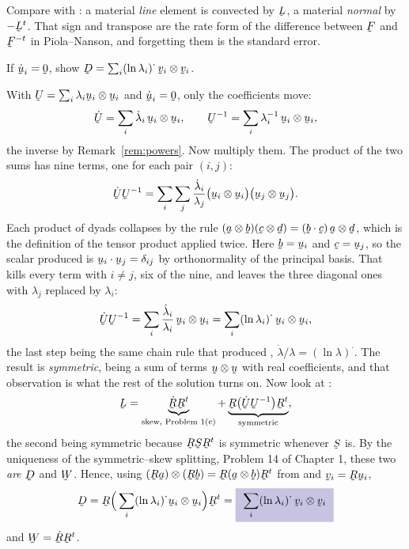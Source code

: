 \begin{solution}
Compare with : a material \emph{line} element is convected by
$\bL$, a material \emph{normal} by $-\bL^{t}$. That sign and transpose
are the rate form of the difference between $\bF$ and $\bF^{-t}$ in
Piola--Nanson, and forgetting them is the standard error.
\end{solution}

\begin{problem}
If $\dot\bu_{i}=\bze$, show
$\bD=\sum_{i}(\ln\lambda_{i})^{\textstyle\cdot}\,\bv_{i}\otimes\bv_{i}$.
\end{problem}

\begin{solution}
With $\bU=\sum_{i}\lambda_{i}\bu_{i}\otimes\bu_{i}$ and
$\dot\bu_{i}=\bze$, only the coefficients move:
\[
   \dot\bU=\sum_{i}\dot\lambda_{i}\,\bu_{i}\otimes\bu_{i},
   \qquad
   \bU^{-1}=\sum_{i}\lambda_{i}^{-1}\,\bu_{i}\otimes\bu_{i},
\]
the inverse by Remark~\ref{rem:powers}. Now multiply them. The product of
the two sums has nine terms, one for each pair $(i,j)$:
\[
   \dot\bU\bU^{-1}
   =\sum_{i}\sum_{j}\frac{\dot\lambda_{i}}{\lambda_{j}}
     \big(\bu_{i}\otimes\bu_{i}\big)\big(\bu_{j}\otimes\bu_{j}\big).
\]
Each product of dyads collapses by the rule
$(\ba\otimes\bb)(\bc\otimes\bd)=(\ip\bb\bc)\,\ba\otimes\bd$, which is the
definition of the tensor product applied twice. Here $\bb=\bu_{i}$ and
$\bc=\bu_{j}$, so the scalar produced is $\ip{\bu_{i}}{\bu_{j}}=\dd_{ij}$
by orthonormality of the principal basis. That kills every term with
$i\neq j$, six of the nine, and leaves the three diagonal ones with
$\lambda_{j}$ replaced by $\lambda_{i}$:
\[
   \dot\bU\bU^{-1}
   =\sum_{i}\frac{\dot\lambda_{i}}{\lambda_{i}}\,
     \bu_{i}\otimes\bu_{i}
   =\sum_{i}(\ln\lambda_{i})^{\textstyle\cdot}\,\bu_{i}\otimes\bu_{i},
\]
the last step being the same chain rule that produced ,
$\dot\lambda/\lambda=(\ln\lambda)^{\textstyle\cdot}$. The result is
\emph{symmetric}, being a sum of terms $\bu\otimes\bu$ with real
coefficients, and that observation is what the rest of the solution turns
on. Now look at :
\[
   \bL=\underbrace{\dot\bR\bR^{t}}_{\text{skew, Problem 1(c)}}
      +\underbrace{\bR\big(\dot\bU\bU^{-1}\big)\bR^{t}}_{\text{symmetric}},
\]
the second being symmetric because $\bR\bS\bR^{t}$ is symmetric whenever
$\bS$ is. By the uniqueness of the symmetric--skew splitting, Problem 14
of Chapter 1, these two \emph{are} $\bD$ and $\bW$. Hence, using
$(\bR\ba)\otimes(\bR\bb)=\bR(\ba\otimes\bb)\bR^{t}$ from  and
$\bv_{i}=\bR\bu_{i}$,
\[
   \bD=\bR\Big(\sum_{i}(\ln\lambda_{i})^{\textstyle\cdot}
       \bu_{i}\otimes\bu_{i}\Big)\bR^{t}
   =\boxed{\ \sum_{i}(\ln\lambda_{i})^{\textstyle\cdot}\,
     \bv_{i}\otimes\bv_{i}\ }
\]
and $\bW=\dot\bR\bR^{t}$.


\end{solution}
